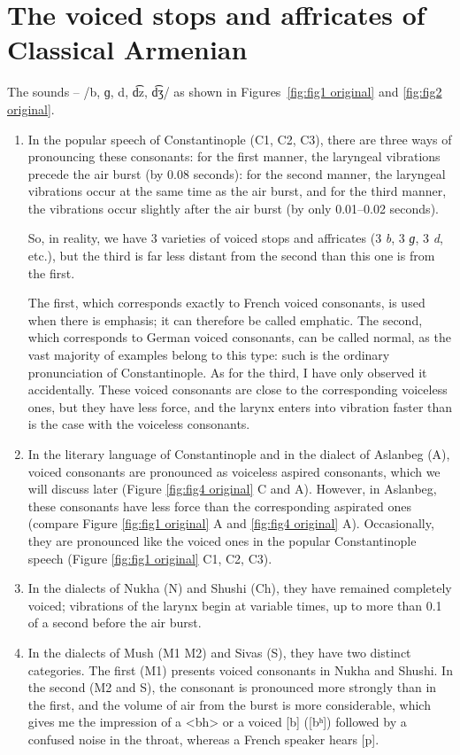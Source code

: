 \documentclass[output=paper]{langscibook}
\begin{document}
\section{The voiced stops and affricates of Classical Armenian}

The sounds  – /b, ɡ, d,  d͡z,  d͡ʒ/  as shown in Figures~\ref{fig:fig1 original} and \ref{fig:fig2 original}. 

\begin{enumerate}
\item In the popular speech of Constantinople (C1, C2, C3), there are three ways of pronouncing these consonants: for the first manner, the laryngeal vibrations precede the air burst (by 0.08 seconds): for the second manner, the laryngeal vibrations occur at the same time as the air burst, and for the third manner, the vibrations occur slightly after the air burst (by only 0.01–0.02 seconds).

So, in reality, we have 3 varieties of voiced stops and affricates (3 \textit{b}, 3 \textit{ɡ}, 3 \textit{d}, etc.), but the third is far less distant from the second than this one is from the first.

The first, which corresponds exactly to French voiced consonants, is used when there is emphasis; it can therefore be called emphatic. The second, which corresponds to German voiced consonants, can be called normal, as the vast majority of examples belong to this type: such is the ordinary pronunciation of Constantinople. As for the third, I have only observed it accidentally. These voiced consonants are close to the corresponding voiceless ones, but they have less force, and the larynx enters into vibration faster than is the case with the voiceless consonants.

\item In the literary language of Constantinople and in the dialect of Aslanbeg (A), voiced consonants are pronounced as voiceless aspired consonants, which we will discuss later (Figure \ref{fig:fig4 original} C  and A). However, in Aslanbeg, these consonants have less force than the corresponding aspirated ones (compare Figure \ref{fig:fig1 original} A and \ref{fig:fig4 original} A). Occasionally, they are pronounced like the voiced ones in the popular Constantinople speech (Figure \ref{fig:fig1 original} C1, C2, C3).

\item In the dialects of Nukha (N) and Shushi (Ch), they have remained completely voiced; vibrations of the larynx begin at variable times, up to more than 0.1 of a second before the air burst.

\item In the dialects of Mush (M1 M2) and Sivas (S), they have two distinct categories. The first (M1) presents voiced consonants in Nukha and Shushi. In the second (M2 and S), the consonant is pronounced more strongly than in the first, and the volume of air from the burst is more considerable,  which gives me the impression of a <bh> or a voiced [b] ([bʰ]) followed by a confused noise in the throat, whereas a French speaker hears [p].
\end{enumerate}
\end{document}
